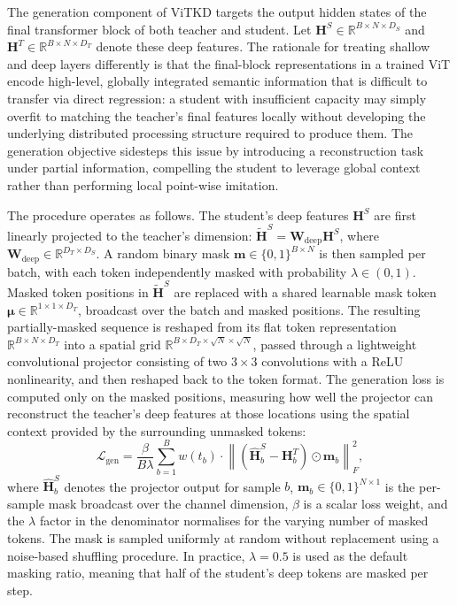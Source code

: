 The generation component of ViTKD targets the output hidden states of the final transformer block of both teacher and student. Let $\mathbf{H}^S \in \mathbb{R}^{B \times N \times D_S}$ and $\mathbf{H}^T \in \mathbb{R}^{B \times N \times D_T}$ denote these deep features. The rationale for treating shallow and deep layers differently is that the final-block representations in a trained ViT encode high-level, globally integrated semantic information that is difficult to transfer via direct regression: a student with insufficient capacity may simply overfit to matching the teacher's final features locally without developing the underlying distributed processing structure required to produce them. The generation objective sidesteps this issue by introducing a reconstruction task under partial information, compelling the student to leverage global context rather than performing local point-wise imitation.

The procedure operates as follows. The student's deep features $\mathbf{H}^S$ are first linearly projected to the teacher's dimension: $\tilde{\mathbf{H}}^S = \mathbf{W}_{\text{deep}} \mathbf{H}^S$, where $\mathbf{W}_{\text{deep}} \in \mathbb{R}^{D_T \times D_S}$. A random binary mask $\mathbf{m} \in \{0, 1\}^{B \times N}$ is then sampled per batch, with each token independently masked with probability $\lambda \in (0, 1)$. Masked token positions in $\tilde{\mathbf{H}}^S$ are replaced with a shared learnable mask token $\boldsymbol{\mu} \in \mathbb{R}^{1 \times 1 \times D_T}$, broadcast over the batch and masked positions. The resulting partially-masked sequence is reshaped from its flat token representation $\mathbb{R}^{B \times N \times D_T}$ into a spatial grid $\mathbb{R}^{B \times D_T \times \sqrt{N} \times \sqrt{N}}$, passed through a lightweight convolutional projector consisting of two $3 \times 3$ convolutions with a ReLU nonlinearity, and then reshaped back to the token format. The generation loss is computed only on the masked positions, measuring how well the projector can reconstruct the teacher's deep features at those locations using the spatial context provided by the surrounding unmasked tokens:
%
\begin{equation}
    \mathcal{L}_{\text{gen}} = \frac{\beta}{B \lambda} \sum_{b=1}^{B} w(t_b) \cdot \left\| \left( \hat{\mathbf{H}}_b^S - \mathbf{H}_b^T \right) \odot \mathbf{m}_b \right\|_F^2,
    \label{eq:loss_gen}
\end{equation}
%
where $\hat{\mathbf{H}}_b^S$ denotes the projector output for sample $b$, $\mathbf{m}_b \in \{0,1\}^{N \times 1}$ is the per-sample mask broadcast over the channel dimension, $\beta$ is a scalar loss weight, and the $\lambda$ factor in the denominator normalises for the varying number of masked tokens. The mask is sampled uniformly at random without replacement using a noise-based shuffling procedure. In practice, $\lambda = 0.5$ is used as the default masking ratio, meaning that half of the student's deep tokens are masked per step.

